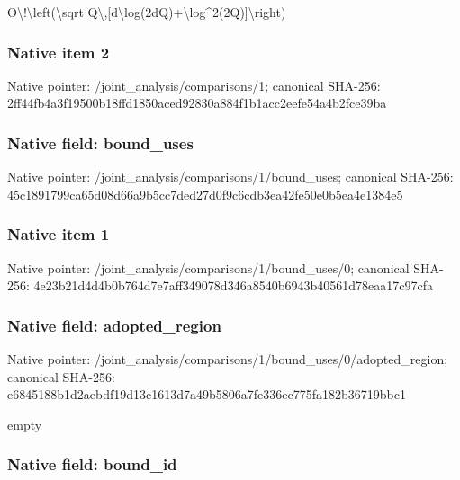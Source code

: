 \documentclass[10pt,a4paper]{article}
\begin{document}
O\textbackslash{}!\textbackslash{}left(\textbackslash{}sqrt Q\textbackslash{},[d\textbackslash{}log(2dQ)+\textbackslash{}log\textasciicircum{}2(2Q)]\textbackslash{}right)


\subsubsection{Native item 2}


Native pointer: /joint\_analysis/comparisons/1; canonical SHA-256: 2ff44fb4a3f19500b18ffd18\allowbreak{}50aced92830a884f1b1acc2e\allowbreak{}efe54a4b2fce39ba



\subsubsection{Native field: bound\_uses}


Native pointer: /joint\_analysis/comparis\allowbreak{}ons/1/bound\_uses; canonical SHA-256: 45c1891799ca65d08d66a9b5\allowbreak{}cc7ded27d0f9c6cdb3ea42fe\allowbreak{}50e0b5ea4e1384e5



\subsubsection{Native item 1}


Native pointer: /joint\_analysis/comparis\allowbreak{}ons/1/bound\_uses/0; canonical SHA-256: 4e23b21d4d4b0b764d7e7aff\allowbreak{}349078d346a8540b6943b405\allowbreak{}61d78eaa17c97cfa



\subsubsection{Native field: adopted\_region}


Native pointer: /joint\_analysis/comparis\allowbreak{}ons/1/bound\_uses/0/adopt\allowbreak{}ed\_region; canonical SHA-256: e6845188b1d2aebdf19d13c1\allowbreak{}613d7a49b5806a7fe336ec77\allowbreak{}5fa182b36719bbc1


empty


\subsubsection{Native field: bound\_id}
\end{document}
